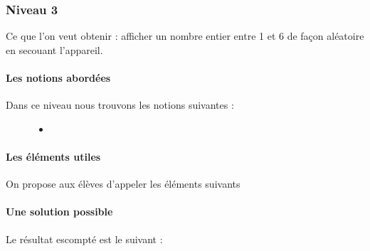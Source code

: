 \documentclass[letterpaper,10pt,french]{sphinxmanual}
\begin{document}
\begin{sphinxVerbatim}[commandchars=\\\{\}]
     
             
             
\end{sphinxVerbatim}


\subsubsection{Niveau 3}
\label{\detokenize{decouverte/de6faces-python3::doc}}\label{\detokenize{decouverte/de6faces-python3:niveau-3}}
Ce que l’on veut obtenir : afficher  un nombre entier entre 1 et 6 de façon aléatoire en secouant l’appareil.


\paragraph{Les notions abordées}
\label{\detokenize{decouverte/de6faces-python3:les-notions-abordees}}\begin{description}
\item[{Dans ce niveau nous trouvons les notions suivantes :}] \leavevmode\begin{itemize}
\item {} 
\end{itemize}

\end{description}


\paragraph{Les éléments utiles}
\label{\detokenize{decouverte/de6faces-python3:les-elements-utiles}}
On propose aux élèves d’appeler les éléments suivants


\paragraph{Une solution possible}
\label{\detokenize{decouverte/de6faces-python3:une-solution-possible}}
Le résultat escompté est le suivant :
\end{document}

